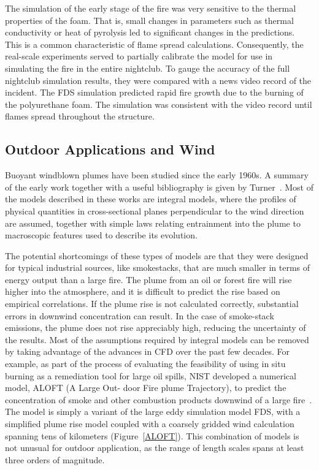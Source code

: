 \documentclass[graybox]{svmult}
\begin{document}
The simulation of the early stage of the fire was very sensitive to the thermal properties of the foam. That is, small changes in parameters such as thermal conductivity or heat of pyrolysis led to significant changes in the predictions. This is a common characteristic of flame spread calculations. Consequently, the real-scale experiments served to partially calibrate the model for use in simulating the fire in the entire nightclub. To gauge the accuracy of the full nightclub simulation results, they were compared with a news video record of the incident. The FDS simulation predicted rapid fire growth due to the burning of the polyurethane foam. The simulation was consistent with the video record until flames spread throughout the structure.


\subsection{Outdoor Applications and Wind}

Buoyant windblown plumes have been studied since the early 1960s. A summary of the early work together with a useful bibliography is given by Turner~\cite{Turner}. Most of the models described in these works are integral models, where the profiles of physical quantities in cross-sectional planes perpendicular to the wind direction are assumed, together with simple laws relating entrainment into the plume to macroscopic features used to describe its evolution.

The potential shortcomings of these types of models are that they were designed for typical industrial sources, like smokestacks, that are much smaller in terms of energy output than a large fire. The plume from an oil or forest fire will rise higher into the atmosphere, and it is difficult to predict the rise based on empirical correlations. If the plume rise is not calculated correctly, substantial errors in downwind concentration can result. In the case of smoke-stack emissions, the plume does not rise appreciably high, reducing the uncertainty of the results.
Most of the assumptions required by integral models can be removed by taking advantage of the advances in CFD over the past few decades. For example, as part of the process of evaluating the feasibility of using in situ burning as a remediation tool for large oil spills, NIST developed a numerical model, ALOFT (A Large Out- door Fire plume Trajectory), to predict the concentration of smoke and other combustion products downwind of a large fire~\cite{Baum}. The model is simply a variant of the large eddy simulation model FDS, with a simplified plume rise model coupled with a coarsely gridded wind calculation spanning tens of kilometers (Figure~\ref{ALOFT}). This combination of models is not unusual for outdoor application, as the range of length scales spans at least three orders of magnitude.
\end{document}
